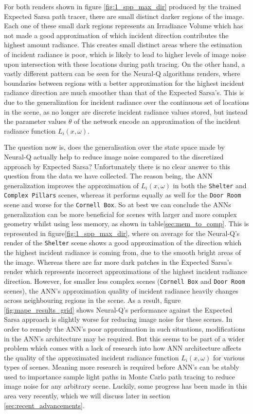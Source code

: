 \documentclass[../dissertation.tex]{subfiles}
\begin{document}
For both renders shown in figure \ref{fig:1_spp_max_dir} produced by the trained Expected Sarsa path tracer, there are small distinct darker regions of the image. Each one of these small dark regions represents an Irradiance Volume which has not made a good approximation of which incident direction contributes the highest amount radiance. This creates small distinct areas where the estimation of incident radiance is poor, which is likely to lead to higher levels of image noise upon intersection with these locations during path tracing. On the other hand, a vastly different pattern can be seen for the Neural-Q algorithms renders, where boundaries between regions with a better approximation for the highest incident radiance direction are much smoother than that of the Expected Sarsa's. This is due to the generalization for incident radiance over the continuous set of locations in the scene, as no longer are discrete incident radiance values stored, but instead the parameter values $\theta$ of the network encode an approximation of the incident radiance function $L_i(x, \omega)$.

The question now is, does the generalisation over the state space made by Neural-Q actually help to reduce image noise compared to the discretized approach by Expected Sarsa? Unfortunately there is no clear answer to this question from the data we have collected. The reason being, the ANN generalization improves the approximation of $L_i(x, \omega)$ in both the \verb|Shelter| and \verb|Complex Pillars| scenes, whereas it performs equally as well for the \verb|Door Room| scene and worse for the \verb|Cornell Box|. So at best we can conclude the ANNs generalization can be more  beneficial for scenes with larger and more complex geometry whilst using less memory, as shown in table\ref{sec:mem_to_comp}. This is represented in figure\ref{fig:1_spp_max_dir}, where on average for the Neural-Q's render of the \verb|Shelter| scene shows a good approximation of the direction which the highest incident radiance is coming from, due to the smooth bright areas of the image. Whereas there are far more dark patches in the Expected Sarsa's render which represents incorrect approximations of the highest incident radiance direction. However, for smaller less complex scenes (\verb|Cornell Box| and \verb|Door Room| scenes), the ANN's approximation quality of incident radiance heavily changes across neighbouring regions in the scene. As a result, figure \ref{fig:mape_results_grid} shows Neural-Q's performance against the Expected Sarsa approach is slightly worse for reducing image noise for these scenes. In order to remedy the ANN's poor approximation in such situations, modifications in the ANN's architecture may be required. But this seems to be part of a wider problem which comes with a lack of research into how ANN architecture affects the quality of the approximated incident radiance function $L_i(x, \omega)$ for various types of scenes. Meaning more research is required before ANN's can be stably used to importance sample light paths in Monte Carlo path tracing to reduce image noise for any arbitrary scene. Luckily, some progress has been made in this area very recently, which we will discuss later in section \ref{sec:recent_advancements}.
\end{document}
